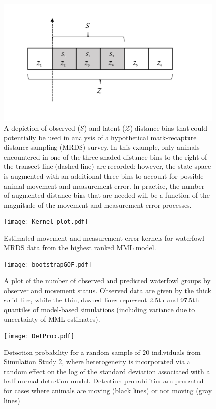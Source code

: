 \documentclass[12pt,fleqn]{article}
\begin{document}
\pagebreak
\begin{figure}
\begin{center}
\includegraphics[width=150mm]{augmented_bin_figure.pdf}
\caption{A depiction of observed ($\mathcal{S}$) and latent ($\mathcal{Z}$) distance bins that could potentially be used in analysis of a hypothetical mark-recapture distance sampling (MRDS) survey.  In this example, only animals encountered in one of the three shaded distance bins to the right of the transect line (dashed line) are recorded; however, the state space is augmented with an additional three bins to account for possible animal movement and measurement error.  In practice, the number of augmented distance bins that are needed will be a function of the magnitude of the movement and measurement error processes.}
\label{fig:aug_bins}
\end{center}
\end{figure}


\pagebreak
\begin{figure}
\begin{center}
\texttt{[image: Kernel\_plot.pdf]}
\caption{Estimated movement and measurement error kernels for waterfowl MRDS data from the highest ranked MML model.  }
\label{fig:kernel}
\end{center}
\end{figure}

\pagebreak
\begin{figure}
\begin{center}
\texttt{[image: bootstrapGOF.pdf]}
\caption{A plot of the number of observed and predicted waterfowl groups by observer and movement status.  Observed data are given by the thick solid line, while the thin, dashed lines represent 2.5th and 97.5th quantiles of model-based simulations (including variance due to uncertainty of MML estimates).  }
\label{fig:GOF}
\end{center}
\end{figure}


\pagebreak
\begin{figure}
\begin{center}
\texttt{[image: DetProb.pdf]}
\caption{Detection probability for a random sample of 20 individuals from Simulation Study 2, where heterogeneity is incorporated via a random effect on the log of the standard deviation associated with a half-normal detection model.  Detection probabilities are presented for cases where animals are moving (black lines) or not moving (gray lines)}
\label{fig:hn}
\end{center}
\end{figure}
\end{document}
